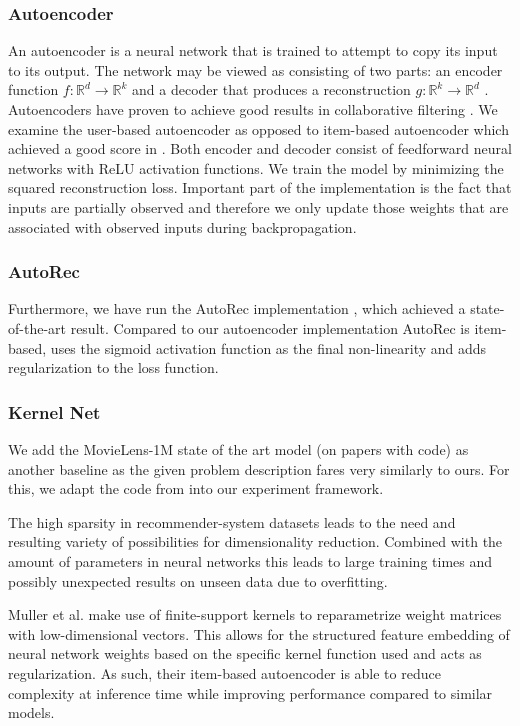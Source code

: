 \documentclass[10pt,conference,compsocconf]{IEEEtran}
\begin{document}
    \subsubsection{Autoencoder}
    An autoencoder is a neural network that is trained to attempt to copy its input to its output.
    The network may be viewed as consisting of two parts: an encoder function $f: \mathbb{R} ^d \rightarrow \mathbb{R} ^k$ and a
    decoder that produces a reconstruction $g: \mathbb{R} ^k \rightarrow \mathbb{R} ^d$ \cite{Goodfellow-et-al-2016}.
    Autoencoders have proven to achieve good results in collaborative filtering \cite{inproceedings}.
    We examine the user-based autoencoder as opposed to item-based autoencoder which achieved a good score in \cite{inproceedings}.
    Both encoder and decoder consist of feedforward neural networks with ReLU activation functions.
    We train the model by minimizing the squared reconstruction loss.
    Important part of the implementation is the fact that inputs are partially observed and therefore we only update those weights that are associated with observed inputs during backpropagation.

    \subsubsection{AutoRec}
    Furthermore, we have run the AutoRec implementation \cite{inproceedings}, which achieved a state-of-the-art result.
    Compared to our autoencoder implementation AutoRec is item-based, uses the sigmoid activation function as the final non-linearity and adds regularization to the loss function.

    \subsubsection{Kernel Net}
    We add the MovieLens-1M state of the art model (on papers with code) as another baseline as the given problem description fares very similarly to ours.
    For this, we adapt the code from \cite{pmlr-v80-muller18a, kernelNetGithub} into our experiment framework.

    The high sparsity in recommender-system datasets leads to the need and resulting variety of possibilities for dimensionality reduction.
    Combined with the amount of parameters in neural networks this leads to large training times and possibly
    unexpected results on unseen data due to overfitting.

    Muller et al. make use of finite-support kernels to reparametrize weight matrices with low-dimensional vectors.
    This allows for the structured feature embedding of neural network weights based on the specific kernel function used and
    acts as regularization.
    As such, their item-based autoencoder is able to reduce complexity at inference time while improving performance compared to similar models.\cite{pmlr-v80-muller18a}
\end{document}
